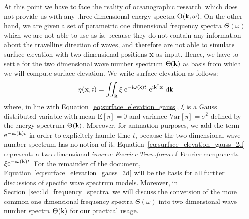 At this point we have to face the reality of oceanographic research, which does 
not provide us with any three dimensional energy spectra 
$\Theta(\mathbf{k},\omega)$. On the other hand, we are given a set of 
parametric one dimensional frequency spectra $\Theta(\omega)$ which we are not 
able to use as-is, because they do not contain any information about the 
travelling direction of waves, and therefore are not able to simulate 
surface elevation with two dimensional positions $\mathbf{x}$ as input. Hence, we 
have to settle for the two dimensional wave number spectrum $\Theta(\mathbf{k})$ 
as basis from which we will compute surface elevation. We write surface 
elevation as follows:
\begin{equation}
\label{eq:surface_elevation_gauss_2d}
 \eta(\mathbf{x}, t) = \iint_{\mathbf{k}} 
\xi~\mathrm{e}^{-\mathrm{i}\omega(\mathbf{k}) t}
~\mathrm{e}^{\mathrm{i}\mathbf{k}^{\mathsf{T}}\mathbf{x}}~\mathrm{d}\mathbf{k}
\end{equation}
where, in line with Equation~\ref{eq:surface_elevation_gauss}, $\xi$ is 
a Gauss distributed variable with mean $\mathrm{E}[\eta] = 0$ and
variance $\mathrm{Var}[\eta] = \sigma^2$ defined by the energy spectrum
$\Theta(\mathbf{k})$. Moreover, for animation purposes, we add the term 
$\mathrm{e}^{-\mathrm{i}\omega(\mathbf{k}) t}$ in order to explicitely handle 
time $t$, because the two dimensional wave number spectrum has no notion of 
it. Equation~\ref{eq:surface_elevation_gauss_2d} represents a two dimensional 
\emph{inverse Fourier Transform} of Fourier components 
$\xi\mathrm{e}^{-\mathrm{i}\omega(\mathbf{k}) t}$. For the remainder of the 
document, Equation~\ref{eq:surface_elevation_gauss_2d} will be the basis for all 
further discussions of specific wave spectrum models. Moreover, in 
Section~\ref{sec:1d_frequency_spectra} we will discuss the conversion of the 
more common one dimensional frequency spectra $\Theta(\omega)$ into two 
dimensional wave number spectra $\Theta(\mathbf{k})$ for our practical usage.
%

